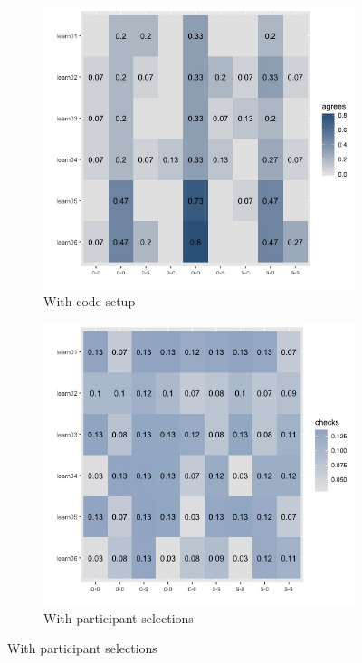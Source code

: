 \documentclass{article}
\begin{document}
\begin{figure}[h!]
  \centering
  \begin{subfigure}[t]{0.45\textwidth}
    \centering
    \includegraphics[width=\linewidth]{nine_theories_w_codenorm} 
    \caption{With code setup}
  \end{subfigure}
  \hfill
  \begin{subfigure}[t]{0.45\textwidth}
    \centering
    \includegraphics[width=\linewidth]{nine_theories_w_ppt} 
    \caption{With participant selections}
  \end{subfigure}
  \label{fig:theory_comp}

\end{figure}
\end{document}
